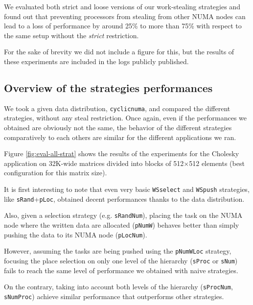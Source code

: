 \documentclass{Styles/llncs}
\begin{document}
We evaluated both strict and loose versions of our work-stealing strategies and found
out that preventing processors from stealing from other NUMA nodes can lead to a loss of performance by
around 25\% to more than 75\% with respect to the same setup without the \emph{strict}
restriction.

For the sake of brevity we did not include a figure for this, but the results of these
experiments are included in the logs publicly published.




\subsection{Overview of the strategies performances}

We took a given data distribution, \verb/cyclicnuma/, and compared the different strategies, without any steal restriction.
Once again, even if the performances we obtained are obviously not the same, the behavior of the different strategies comparatively to each others are similar for the different applications we ran.

Figure \ref{fig:eval-all-strat} shows the results of the experiments for the
Cholesky application on 32K-wide matrices divided into blocks of 512$\times$512 elements (best configuration for this matrix size).

It is first interesting to note that even very basic \verb/WSselect/
and \verb/WSpush/ strategies, like \verb/sRand/+\verb/pLoc/, obtained decent performances
thanks to the data distribution.

Also, given a selection strategy (e.g. \verb/sRandNum/), placing
the task on the NUMA node where the written data are allocated (\verb/pNumW/) behaves better than simply pushing the data to its NUMA node (\verb/pLocNum/).

However, assuming the tasks are being pushed using the \verb/pNumWLoc/ strategy, focusing the
place selection on only one level of the hierarchy (\verb/sProc/ or \verb/sNum/)
fails to reach the same level of performance we obtained with naive strategies.

On the contrary, taking into account both levels of the hierarchy (\verb/sProcNum/,
\verb/sNumProc/) achieve similar performance that outperforms other strategies.
\end{document}
